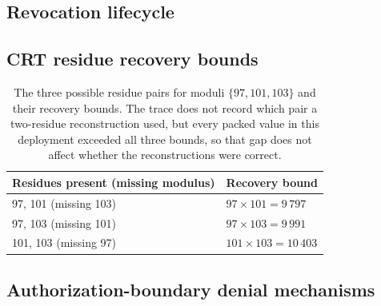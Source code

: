 

\subsection{Revocation lifecycle}



\begin{widefig}
\centering
{}
\caption{Gossip propagation across \RevEvents{} revocation-lifecycle events.}
\label{fig:revocation}
\end{widefig}

\subsection{CRT residue recovery bounds}

\begin{table}[t]
\caption{The three possible residue pairs for moduli $\{97,101,103\}$ and
  their recovery bounds. The trace does not record which pair a two-residue
  reconstruction used, but every packed value in this deployment exceeded
  all three bounds, so that gap does not affect whether the reconstructions
  were correct.}
\label{tab:crtpairs}
\small
\begin{tabularx}{\columnwidth}{@{}lX@{}}
\toprule
Residues present (missing modulus) & Recovery bound \\
\midrule
97, 101 (missing 103) & $97\times 101 = 9\,797$ \\
97, 103 (missing 101) & $97\times 103 = 9\,991$ \\
101, 103 (missing 97) & $101\times 103 = 10\,403$ \\
\bottomrule
\end{tabularx}
\end{table}

\subsection{Authorization-boundary denial mechanisms}



